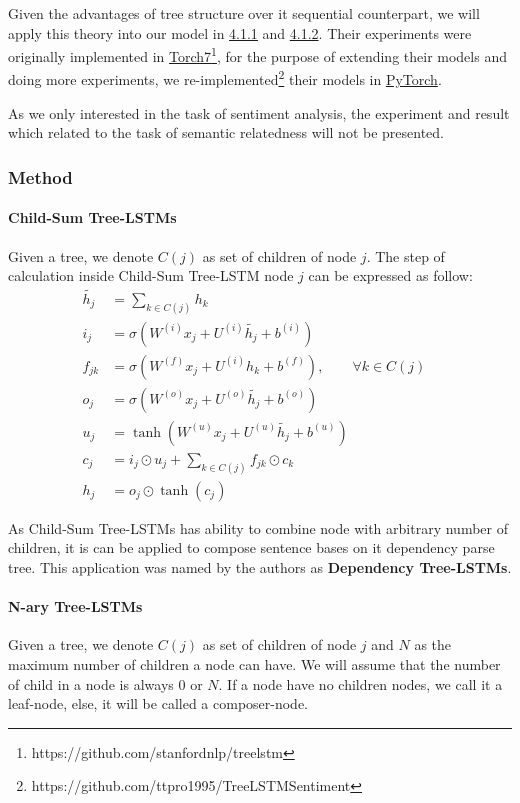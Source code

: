 Given the advantages of tree structure over it sequential counterpart, we will apply this theory into our model in \hyperref[sec:VTtree]{4.1.1} and \hyperref[sec:CNNtree]{4.1.2}. 
Their experiments were originally implemented in \hyperref[sec:torch]{Torch7}\footnote{https://github.com/stanfordnlp/treelstm}, for the purpose of extending their models and doing more experiments, we re-implemented\footnote{https://github.com/ttpro1995/TreeLSTMSentiment} their models in \hyperref[sec:pytorch]{PyTorch}. 

As we only interested in  the task of sentiment analysis, the experiment and result which related to the task of semantic relatedness will not be presented.

\subsubsection{Method}
\paragraph{Child-Sum Tree-LSTMs}
Given a tree, we denote \(C(j)\) as set of children of node \(j\).
The step of calculation inside Child-Sum Tree-LSTM node \(j\) can be expressed as follow\cite{treeLSTM}:
\begin{align}
  	\tilde{h_j} &= \sum_{k \in C(j)} h_k &\label{eq1:2}\\
  	i_j &= \sigma{(W^{(i)}x_j + U^{(i)}\tilde{h_j} + b^{(i)})} &\label{eq1:3}\\
  	f_{jk} &= \sigma{(W^{(f)}x_j + U^{(i)}h_k + b^{(f)})}, \qquad  \forall k \in C(j) & \label{eq1:foget1}\\
  	o_j &= \sigma{(W^{(o)}x_j + U^{(o)}\tilde{h_j} + b^{(o)})} &\label{eq1:5}\\
  	u_j &= \tanh{(W^{(u)}x_j + U^{(u)}\tilde{h_j} + b^{(u)})} &\label{eq1:6}\\
   	c_j &= i_j \odot u_j + \sum_{k \in C(j)} f_{jk} \odot c_k & \\
	h_j &= o_j \odot \tanh{(c_j)} &
\end{align}

As Child-Sum Tree-LSTMs has ability to combine node with arbitrary number of children, it is can be applied to compose sentence bases on it dependency parse tree.
This application was named by the authors as \textbf{Dependency Tree-LSTMs}\cite{treeLSTM}.

\paragraph{N-ary Tree-LSTMs}
Given a tree, we denote \(C(j)\) as set of children of node \(j\) and \(N\) as the maximum number of children a node can have. 
We will assume that the number of child in a node is always \(0\) or \(N\). 
If a node have no children nodes, we call it a leaf-node, else, it will be called a composer-node. 

